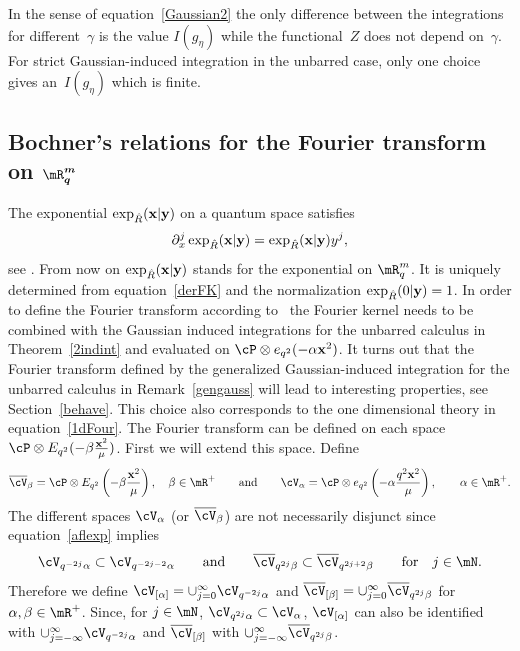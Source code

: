 In the sense of equation~\eqref{Gaussian2} the only dif\/ference between the integrations for dif\/ferent~$\gamma$ is the value $I(g_\eta)$ while the functional~$Z$ does not depend on~$\gamma$. For strict Gaussian-induced integration in the unbarred case, only one choice gives an~$I(g_\eta)$ which is f\/inite.



\subsection[Bochner's relations for the Fourier transform on $\mR^m_q$]{Bochner's relations for the Fourier transform on $\boldsymbol{\mR^m_q}$}\label{boch}

The exponential $\exp_{\hat{R}}(\bold{x}|\bold{y})$ on a quantum space satisf\/ies
\begin{gather}
\label{derFK}
\partial_x^j\exp_{\hat{R}}(\bold{x}|\bold{y}) = \exp_{\hat{R}}(\bold{x}|\bold{y})y^j,
\end{gather}
see \cite{MR1303081, MR1235979, MR2099760}. From now on $\exp_{\hat{R}}(\bold{x}|\bold{y})$ stands for the exponential on $\mR^m_q$. It is uniquely determined from equation~\eqref{derFK} and the normalization $\exp_{\hat{R}}(0|\bold{y})=1$. In order to def\/ine the Fourier transform according to~\cite{MR1303081} the Fourier kernel needs to be combined with the Gaussian induced integrations for the unbarred calculus in Theorem~\ref{2indint} and evaluated on  $\cP\otimes e_{q^2}(-\alpha\bold{x}^2)$. It turns out that the Fourier transform def\/ined by the generalized Gaussian-induced integration for the unbarred calculus in Remark~\ref{gengauss} will lead to interesting properties, see Section~\ref{behave}. This choice also corresponds to the one dimensional theory in equation~\eqref{1dFour}. The Fourier transform can be def\/ined on each space $\cP\otimes E_{q^2}(-\beta \frac{\bold{x}^2}{\mu})$. First we will extend this space. Def\/ine
\begin{gather*}
\overline{\cV}_\beta =\cP\otimes E_{q^2}\left(-\beta \frac{\bold{x}^2}{\mu}\right),\quad\beta\in\mR^+ \qquad \mbox{and} \qquad \cV_\alpha=\cP\otimes e_{q^2}\left(-\alpha\frac{q^2\bold{x}^2}{\mu}\right),\qquad\alpha\in\mR^+.
\end{gather*}
The dif\/ferent spaces $\cV_\alpha$ (or $\overline{\cV}_\beta$) are not necessarily disjunct since equation~\eqref{aflexp} implies
\begin{gather*}
\cV_{q^{-2j}\alpha}\subset\cV_{q^{-2j-2}\alpha} \qquad \mbox{and} \qquad \overline{\cV}_{q^{2j}\beta}\subset\overline{\cV}_{q^{2j+2}\beta}\qquad\mbox{for}\quad j\in\mN.
\end{gather*}
Therefore we def\/ine $\cV_{[\alpha]}=\cup_{j=0}^\infty \cV_{q^{-2j}\alpha}$ and $\overline{\cV}_{[\beta]}=\cup_{j=0}^\infty \overline{\cV}_{q^{2j}\beta}$ for $\alpha,\beta\in\mR^+$. Since, for $j\in\mN$, $\cV_{q^{2j}\alpha}\subset\cV_{\alpha}$,  $\cV_{[\alpha]}$ can also be identif\/ied with $\cup_{j=-\infty}^\infty \cV_{q^{-2j}\alpha}$ and $\overline{\cV}_{[\beta]}$ with $\cup_{j=-\infty}^\infty \overline{\cV}_{q^{2j}\beta}$.

